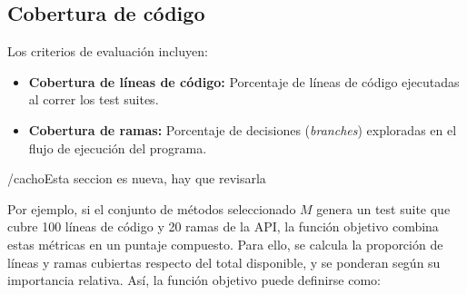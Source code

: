 

\subsection{Cobertura de código}
\label{sec:fitnessRandoop}
Los criterios de evaluación incluyen:
\begin{itemize}
    \item \textbf{Cobertura de líneas de código:} Porcentaje de líneas de código ejecutadas al correr los test suites.
    \item \textbf{Cobertura de ramas:} Porcentaje de decisiones (\textit{branches}) exploradas en el flujo de ejecución del programa.
\end{itemize}

/cacho{Esta seccion es nueva, hay que revisarla}


Por ejemplo, si el conjunto de métodos seleccionado $M$ genera un test suite que cubre 100 líneas de código y 20 ramas de la API, 
la función objetivo combina estas métricas en un puntaje compuesto. 
Para ello, se calcula la proporción de líneas y ramas cubiertas respecto del total disponible, 
y se ponderan según su importancia relativa. Así, la función objetivo puede definirse como:

